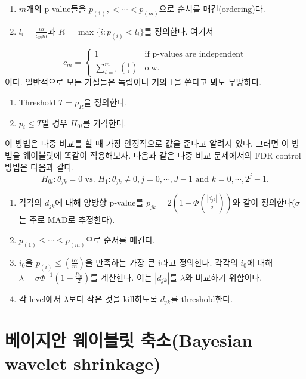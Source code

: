 \documentclass[b5paper,]{book}
\theoremstyle{definition}
\theoremstyle{definition}
\theoremstyle{definition}
\theoremstyle{remark}
\begin{document}
\begin{enumerate}
\def\labelenumi{\arabic{enumi}.}
\item
  \(m\)개의 p-value들을 \(p_{(1)}, < \cdots < p_{(m)}\)으로 순서를
  매긴(ordering)다.
\item
  \(l_{i}=\frac{i\alpha}{c_{m}m}\)과 \(R=\max \{i: p_{(i)}< l_{i}\}\)를
  정의한다. 여기서
\end{enumerate}

\[
c_{m}=
\begin{cases}
1 & \text{if p-values are independent}\\
\sum_{i=1}^{m}(\frac{1}{i}) & \text{o.w.}
\end{cases}
\] 이다. 일반적으로 모든 가설들은 독립이니 거의 1을 쓴다고 봐도
무방하다.

\begin{enumerate}
\def\labelenumi{\arabic{enumi}.}
\setcounter{enumi}{2}
\item
  Threshold \(T=p_{R}\)을 정의한다.
\item
  \(p_{i} \leq T\)일 경우 \(H_{0i}\)를 기각한다.
\end{enumerate}

이 방법은 다중 비교를 할 때 가장 안정적으로 값을 준다고 알려져 있다.
그러면 이 방법을 웨이블릿에 똑같이 적용해보자. 다음과 같은 다중 비교
문제에서의 FDR control 방법은 다음과 같다.
\[H_{0i}:\theta_{jk}=0 \text{ vs. } H_{1}:\theta_{jk} \neq 0, j=0,\cdots, J-1 \text{ and } k=0, \cdots, 2^{j}-1.\]

\begin{enumerate}
\def\labelenumi{\arabic{enumi}.}
\item
  각각의 \(d_{jk}\)에 대해 양뱡향 p-value를
  \(p_{jk}=2(1-\Phi (\frac{| d_{jk}|}{\sigma}))\)와 같이
  정의한다(\(\sigma\)는 주로 MAD로 추정한다).
\item
  \(p_{(1)} \leq \cdots \leq p_{(m)}\)으로 순서를 매긴다.
\item
  \(i_{0}\)을 \(p_{(i)} \leq (\frac{i\alpha}{m})\)을 만족하는 가장 큰
  \(i\)라고 정의한다. 각각의 \(i_{0}\)에 대해
  \(\lambda = \sigma \Phi^{-1}(1-\frac{p_{i0}}{2})\)를 계산한다. 이는
  \(|d_{jk}|\)를 \(\lambda\)와 비교하기 위함이다.
\item
  각 level에서 \(\lambda\)보다 작은 것을 kill하도록 \(d_{jk}\)를
  threshold한다.
\end{enumerate}

\section{베이지안 웨이블릿 축소(Bayesian wavelet
shrinkage)}\label{--bayesian-wavelet-shrinkage}
\end{document}
